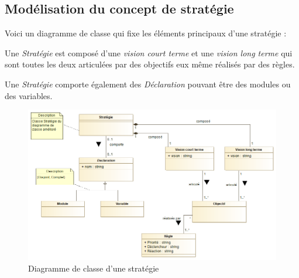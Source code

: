 
\subsection{Modélisation du concept de stratégie}
\label{sec:question7}
Voici un diagramme de classe qui fixe les éléments principaux d'une stratégie :

Une \emph{Stratégie} est composé d'une \emph{vision court terme} et une \emph{vision long terme} qui sont toutes les deux articulées par des objectifs eux même réalisés par des règles.

Une \emph{Stratégie} comporte également des \emph{Déclaration} pouvant être des modules ou des variables.

\begin{figure}[h!]
	\centering
	\includegraphics[width=450pt]{assets/strat_base}
	\caption{Diagramme de classe d'une stratégie}
	\label{fig:strategie}
\end{figure}

\newpage
